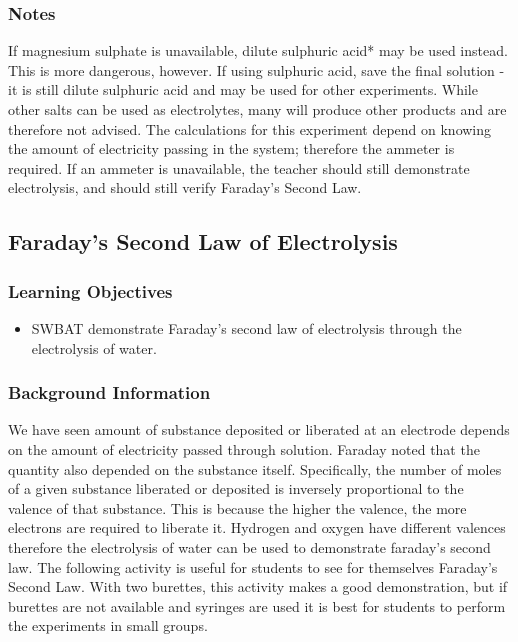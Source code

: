 \subsubsection*{Notes}
If magnesium sulphate is unavailable, dilute sulphuric acid* may be used instead. This is more dangerous, however. If using sulphuric acid, save the final solution - it is still dilute sulphuric acid and may be used for other experiments. While other salts can be used as electrolytes, many will produce other products and are therefore not advised. The calculations for this experiment depend on knowing the amount of electricity passing in the system; therefore the ammeter is required. If an ammeter is unavailable, the teacher should still demonstrate electrolysis, and should still verify Faraday's Second Law.

\subsection{Faraday's Second Law of Electrolysis}

\subsubsection*{Learning Objectives}
\begin{itemize}
\item{SWBAT demonstrate Faraday's second law of electrolysis through the electrolysis of water.}
\end{itemize}

\subsubsection*{Background Information}
We have seen amount of substance deposited or liberated at an electrode depends on the amount of electricity passed through solution. Faraday noted that the quantity also depended on the substance itself. Specifically, the number of moles of a given substance liberated or deposited is inversely proportional to the valence of that substance. This is because the higher the valence, the more electrons are required to liberate it. Hydrogen and oxygen have different valences therefore the electrolysis of water can be used to demonstrate faraday's second law. 
The following activity is useful for students to see for themselves Faraday's Second Law. With two burettes, this activity makes a good demonstration, but if burettes are not available and syringes are used it is best for students to perform the experiments in small groups.

